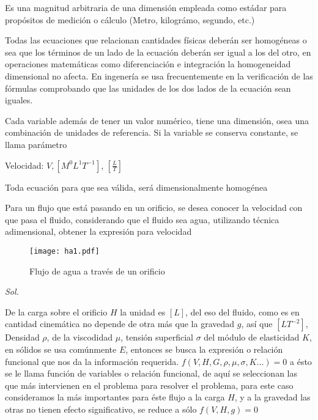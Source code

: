 \begin{definition}[Unidad]
    Es una magnitud arbitraria de una dimensión empleada como estádar para propósitos de medición o cálculo (Metro, kilográmo, segundo, etc.)
\end{definition}

Todas las ecuaciones que relacionan cantidades físicas deberán ser homogéneas o sea que los términos de un lado de la ecuación deberán ser igual a los del otro, en operaciones matemáticas como diferenciación e integración la homogeneidad dimensional no afecta. En ingenería se usa frecuentemente en la verificación de las fórmulas comprobando que las unidades de los dos lados de la ecuación sean iguales.

Cada variable además de tener un valor numérico, tiene una dimensión, osea una combinación de unidades de referencia. Si la variable se conserva constante, se llama parámetro

\begin{example}
    Velocidad: $V,\left[M^0L^1T^{-1}\right]$, $\left[\frac{L}{T}\right]$
\end{example}

\begin{theorem}[Homogeneidad]
    Toda ecuación para que sea válida, será dimensionalmente homogénea
\end{theorem}

\begin{example}
    Para un flujo que está pasando en un orificio, se desea conocer la velocidad con que pasa el fluido, considerando que el fluido sea agua, utilizando técnica adimensional, obtener la expresión para velocidad
\end{example}
\begin{figure}[h!]
\centering
  \texttt{[image: ha1.pdf]}
  \caption{Flujo de agua a través de un orificio}
  \label{ha1}
\end{figure}

\textit{ Sol. }

De la carga sobre el orificio $H$ la unidad es $[L]$, del eso del fluido, como es en cantidad cinemática no depende de otra más que la gravedad $g$, así que $[LT^{-2}]$, Densidad $\rho$, de la viscodidad $\mu$, tensión superficial $\sigma$ del módulo de elasticidad $K$, en sólidos se usa comúnmente $E$, entonces se busca la expresión o relación funcional que nos da la información requerida. $f(V,H,G,\rho,\mu,\sigma,K\dots)=0$ a ésto se le llama función de variables o relación funcional, de aquí se seleccionan las que más intervienen en el problema para resolver el problema, para este caso consideramos la más importantes para éste flujo a la carga $H$, y a la gravedad las otras no tienen efecto significativo, se reduce a sólo $f(V,H,g)=0$

